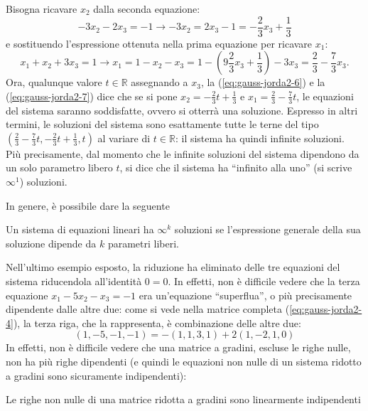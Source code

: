 \begin{es}
    Bisogna ricavare $x_2$ dalla seconda equazione:
    \begin{equation}
      \label{eq:gauss-jorda2-6}
      -3x_2-2x_3=-1\to -3x_2=2x_3-1=-\frac{2}{3}x_3+\frac{1}{3}
    \end{equation}
    e sostituendo l'espressione ottenuta nella prima equazione per
    ricavare $x_1$:
    \begin{equation}
      \label{eq:gauss-jorda2-7}
      x_1+x_2+3x_3=1\to x_1=1-x_2-x_3=1-\left(9\frac{2}{3}x_3+\frac{1}{3}
        \right)-3x_3=\frac{2}{3}-\frac{7}{3}x_3.
    \end{equation}
    Ora, qualunque valore $t\in \mathds{R}$ assegnando a $x_3$, la
    (\ref{eq:gauss-jorda2-6}) e la (\ref{eq:gauss-jorda2-7}) dice che se
    si pone $x_2=-\frac{2}{3}t+\frac{1}{3}$ e
    $x_1=\frac{2}{3}-\frac{7}{3}t$, le equazioni del sistema saranno
    soddisfatte, ovvero si otterrà una soluzione. Espresso in altri
    termini, le soluzioni del sistema sono esattamente tutte le terne
    del tipo $\left(\frac{2}{3}-\frac{7}{3}t, -\frac{2}{3}t+\frac{1}{3},t
    \right)$ al variare di $t\in \mathds{R}$: il sistema ha quindi
    infinite soluzioni.\\
    Più precisamente, dal momento che le infinite
    soluzioni del sistema dipendono da un solo parametro libero $t$, si
    dice che il sistema ha ``infinito alla uno'' (si scrive $\infty^1$)
    soluzioni.
\end{es}
In genere, è possibile dare la seguente
\begin{defi}
  \label{defi:gauss-jorda1}
  Un sistema di equazioni lineari ha $\infty^k$ soluzioni se
  l'espressione generale della sua soluzione dipende da $k$ parametri
  liberi.
\end{defi}
Nell'ultimo esempio esposto, la riduzione ha eliminato delle tre
equazioni del sistema riducendola all'identità $0=0$. In effetti, non è
difficile vedere che la terza equazione $x_1-5x_2-x_3=-1$ era un'equazione
``superflua'', o più precisamente dipendente dalle altre due: come si
vede nella matrice completa (\ref{eq:gauss-jorda2-4}), la terza riga, che
la rappresenta, è combinazione delle altre due:
\begin{equation*}
  (1,-5,-1,-1)=-(1,1,3,1)+2(1,-2,1,0)
\end{equation*}
In effetti, non è difficile vedere che una matrice a gradini, escluse le
righe nulle, non ha più righe dipendenti (e quindi le equazioni non
nulle di un sistema ridotto a gradini sono sicuramente indipendenti):
\begin{prop}
  \label{prop:gauss-jorda1}
  Le righe non nulle di una matrice ridotta a gradini sono
  linearmente indipendenti
\end{prop}
